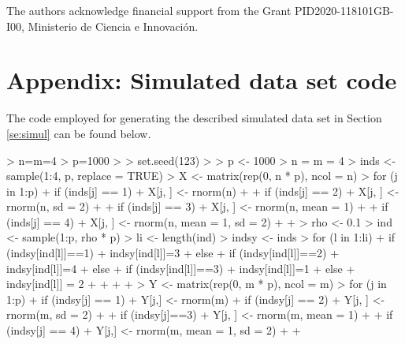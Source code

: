 The authors acknowledge financial support from the Grant PID2020-118101GB-I00, Ministerio de Ciencia e Innovaci\'on.





\appendix
\section{Appendix: Simulated data set code}\label{appendix}

The code employed for generating the described simulated data set in Section \ref{se:simul} can be found below.

\begin{example}
	> n=m=4
	> p=1000
	> 
	> set.seed(123)
	> 
	> p <- 1000
	> n = m = 4
	> inds <- sample(1:4, p, replace = TRUE)
	> X <- matrix(rep(0, n * p), ncol = n)
	> for (j in 1:p){
		+   if (inds[j] == 1){
			+     X[j, ] <- rnorm(n)
			+   }
		+   if (inds[j] == 2){
			+     X[j, ] <- rnorm(n, sd = 2)
			+   }
		+   if (inds[j] == 3){
			+     X[j, ] <- rnorm(n, mean = 1)
			+   }
		+   if (inds[j] == 4){
			+     X[j, ] <- rnorm(n, mean = 1, sd = 2)
			+   }
		+ }
	> rho <-  0.1
	> ind <- sample(1:p, rho * p)
	> li <- length(ind)
	> indsy <- inds
	> for (l in 1:li){
		+   if (indsy[ind[l]]==1){
			+     indsy[ind[l]]=3
			+   } else {
			+     if (indsy[ind[l]]==2){
				+       indsy[ind[l]]=4
				+     } else {
				+       if (indsy[ind[l]]==3){
					+         indsy[ind[l]]=1
					+       } else {
					+         indsy[ind[l]] = 2
					+       }
				+     }
			+   }
		+ }
	> Y <- matrix(rep(0, m * p), ncol = m)
	> for (j in 1:p){
		+   if (indsy[j] == 1){
			+     Y[j,] <- rnorm(m)}
		+   if (indsy[j] == 2){
			+     Y[j, ] <- rnorm(m, sd = 2)
			+   }
		+   if (indsy[j]==3){
			+     Y[j, ] <- rnorm(m, mean = 1)
			+   }
		+   if (indsy[j] == 4){
			+     Y[j,] <- rnorm(m, mean = 1, sd = 2)
			+   }
		+ }
\end{example}




